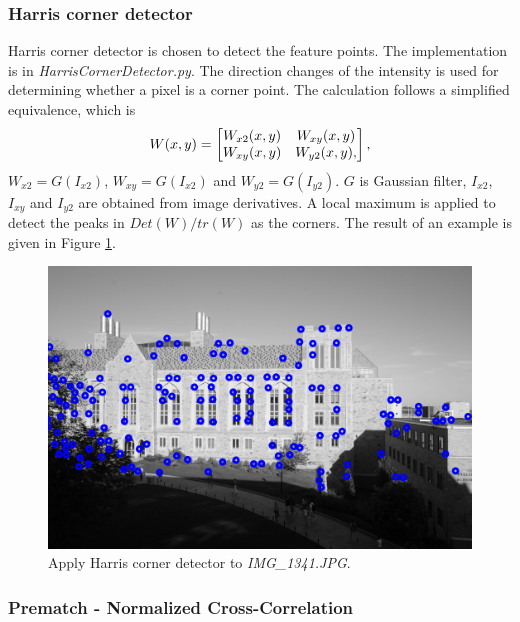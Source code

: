 \documentclass[paper=a4, fontsize=11pt]{scrartcl}
\begin{document}
\subsubsection{Harris corner detector}

Harris corner detector is chosen to detect the feature points.
The implementation is in \emph{HarrisCornerDetector.py}.
The direction changes of the intensity is used for determining whether a pixel is a corner point.
The calculation follows a simplified equivalence, which is
\begin{equation}
W(x,y) = 
\begin{bmatrix}
W_{x2}(x,y) & W_{xy}(x,y) \\
W_{xy}(x,y) & W_{y2}(x,y),
\end{bmatrix} \\,
\end{equation}
$ W_{x2} = G(I_{x2}) $, $ W_{xy} = G(I_{x2}) $ and $ W_{y2} = G(I_{y2}) $.
$ G $ is Gaussian filter, $ I_{x2} $, $ I_{xy} $ and $ I_{y2} $ are obtained from image derivatives.
A local maximum is applied to detect the peaks in $ Det(W) / tr(W) $ as the corners.
The result of an example is given in Figure \ref{fig:corner_detection}.

\begin{figure}[h]
\centering
\includegraphics[width=.8\textwidth]{./figure/IMG_1341_hcd.jpg} 
\caption{Apply Harris corner detector to \emph{IMG\_1341.JPG}.}
\label{fig:corner_detection}
\end{figure}

\subsubsection{Prematch - Normalized Cross-Correlation}
\end{document}
